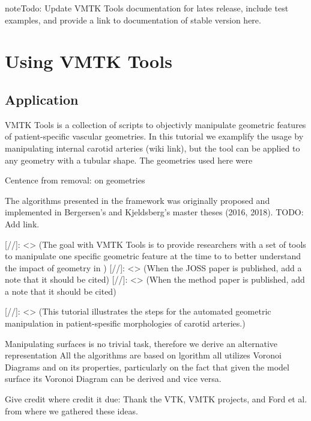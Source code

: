 \documentclass[letterpaper,10pt,english]{sphinxmanual}
\begin{document}
\begin{sphinxadmonition}{note}{\label{installation:index-0}Todo:}
Update VMTK Tools documentation for lates release, include test examples,
and provide a link to
documentation of stable version here.
\end{sphinxadmonition}


\chapter{Using VMTK Tools}
\label{\detokenize{getting_started:using-vmtk-tools}}\label{\detokenize{getting_started::doc}}

\section{Application}
\label{\detokenize{getting_started:application}}
VMTK Tools is a collection of scripts to objectivly manipulate geometric features of patient-specific vascular geometries. In this tutorial we examplify the usage by manipulating internal carotid arteries (wiki link), but the tool can be applied to any geometry with a tubular shape. The geometries used here were

Centence from removal: on geometries

The algorithms presented in the framework was originally proposed and implemented in Bergersen’s and Kjeldsberg’s master theses (2016, 2018). TODO: Add link.

{[}//{]}: \textless{}\textgreater{} (The goal with VMTK Tools is to provide researchers with a set of tools to manipulate one specific geometric feature at the time to to better understand the impact of geometry in )
{[}//{]}: \textless{}\textgreater{} (When the JOSS paper is published, add a note that it should be cited)
{[}//{]}: \textless{}\textgreater{} (When the method paper is published, add a note that it should be cited)

{[}//{]}: \textless{}\textgreater{} (This tutorial illustrates the steps for the automated geometric manipulation in patient-spesific morphologies of carotid arteries.)

Manipulating surfaces is no trivial task, therefore we derive an alternative representation  All the algorithms are based on lgorithm all utilizes Voronoi Diagrams and on its properties, particularly on the fact that given the model surface its Voronoi Diagram can be derived and vice versa.

Give credit where credit it due: Thank the VTK, VMTK projects, and Ford et al. from where we gathered these ideas.
\end{document}
